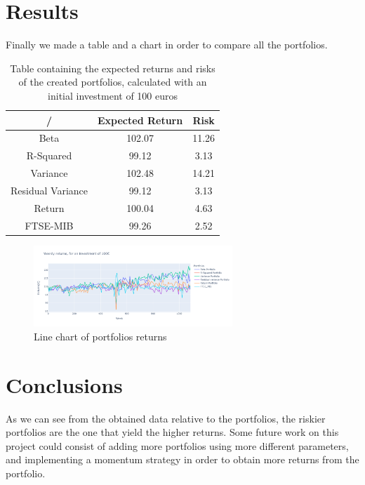 \documentclass[12pt, a4paper, twocolumn]{article} %
\begin{document}
	\section{Results}
		Finally we made a table and a chart in order to compare all the portfolios.
	\begin{table}[H]
		\centering
		\caption{Table containing the expected returns and risks of the created portfolios, calculated with an initial investment of 100 euros}
		\begin{tabular}{ccc} %
			\hline
			/ & Expected Return & Risk\\
			\hline
			Beta& 102.07 & 11.26\\
			R-Squared & 99.12 & 3.13\\
			Variance & 102.48 & 14.21\\
			Residual Variance & 99.12 & 3.13\\
			Return & 100.04 & 4.63 \\
			FTSE-MIB & 99.26 & 2.52\\
		
			\hline
		\end{tabular}
	\end{table}

		\begin{figure}[H]
			\caption{Line chart of portfolios returns}
			\begin{center}
				\includegraphics[width=75mm,scale=1]{port_ret_complete_small.png}
			\end{center}
		\end{figure}

	\section{Conclusions}
	As we can see from the obtained data relative to the portfolios, the riskier portfolios are the one that yield the higher returns. Some future work on this project could consist of adding more portfolios using more different parameters, and implementing a momentum strategy in order to obtain more returns from the portfolio.
\nocite{*} %
\printbibliography[title={Bibliography}] %
\end{document}
